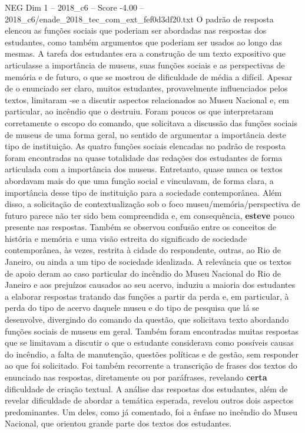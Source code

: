 \begin{textsample}{NEG Dim 1 – 2018\_c6 – Score -4.00 – 2018\_c6/enade\_2018\_tec\_com\_ext\_fef0d3df20.txt}
O padrão de resposta elencou as funções sociais que poderiam ser abordadas nas respostas dos estudantes, como também argumentos que poderiam ser usados ao longo das mesmas.
A tarefa dos estudantes era a construção de um texto expositivo que articulasse a importância de museus, suas funções sociais e as perspectivas de memória e de futuro, o que se mostrou de dificuldade de média a difícil.
Apesar de o enunciado ser claro, muitos estudantes, provavelmente influenciados pelos textos, limitaram -se a discutir aspectos relacionados ao Museu Nacional e, em particular, ao incêndio que o destruiu.
Foram poucos os que interpretaram corretamente o escopo do comando, que solicitava a discussão das funções sociais de museus de uma forma geral, no sentido de argumentar a importância deste tipo de instituição.
As quatro funções sociais elencadas no padrão de resposta foram encontradas na quase totalidade das redações dos estudantes de forma articulada com a importância dos museus.
Entretanto, quase nunca os textos abordavam mais do que uma função social e vinculavam, de forma clara, a importância desse tipo de instituição para a sociedade contemporânea.
Além disso, a solicitação de contextualização sob o foco museu/memória/perspectiva de futuro parece não ter sido bem compreendida e, em consequência, \textbf{esteve} pouco presente nas respostas.
Também se observou confusão entre os conceitos de história e memória e uma visão estreita do significado de sociedade contemporânea, às vezes, restrita à cidade do respondente, outras, ao Rio de Janeiro, ou ainda a um tipo de sociedade idealizada.
A relevância que os textos de apoio deram ao caso particular do incêndio do Museu Nacional do Rio de Janeiro e aos prejuízos causados ao seu acervo, induziu a maioria dos estudantes a elaborar respostas tratando das funções a partir da perda e, em particular, à perda do tipo de acervo daquele museu e do tipo de pesquisa que lá se desenvolve, divergindo do comando da questão, que solicitava texto abordando funções sociais de museus em geral.
Também foram encontradas muitas respostas que se limitavam a discutir o que o estudante considerava como possíveis causas do incêndio, a falta de manutenção, questões políticas e de gestão, sem responder ao que foi solicitado.
Foi também recorrente a transcrição de frases dos textos do enunciado nas respostas, diretamente ou por paráfrases, revelando \textbf{certa} dificuldade de criação textual.
A análise das respostas dos estudantes, além de revelar dificuldade de abordar a temática esperada, revelou outros dois aspectos predominantes.
Um deles, como já comentado, foi a ênfase no incêndio do Museu Nacional, que orientou grande parte dos textos dos estudantes.

\end{textsample}
